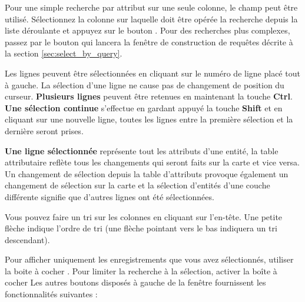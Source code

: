 Pour une simple recherche par attribut sur une seule colonne, le champ  peut être utilisé. Sélectionnez la colonne sur laquelle doit être opérée la recherche depuis la liste déroulante et appuyez sur le bouton . Pour des recherches plus complexes, passez par le bouton  qui lancera la fenêtre de construction de requêtes décrite à la section \ref{sec:select_by_query}.

Les lignes peuvent être sélectionnées en cliquant sur le numéro de ligne placé tout à gauche. La sélection d'une ligne ne cause pas de changement de position du curseur. \textbf{Plusieurs lignes} peuvent être retenues en maintenant la touche \textbf{Ctrl}. \textbf{Une sélection continue} s'effectue en gardant appuyé la touche \textbf{Shift} et en cliquant sur une nouvelle ligne, toutes les lignes entre la première sélection et la dernière seront prises.

\textbf{Une ligne sélectionnée} représente tout les attributs d'une entité, la table attributaire reflète tous les changements qui seront faits sur la carte et vice versa. Un changement de sélection depuis la table d'attributs provoque également un changement de sélection sur la carte et la sélection d'entités d'une couche différente signifie que d'autres lignes ont été sélectionnées.

Vous pouvez faire un tri sur les colonnes en cliquant sur l'en-tête. Une petite flèche indique l'ordre de tri (une flèche pointant vers le bas indiquera un tri descendant).

Pour afficher uniquement les enregistrements que vous avez sélectionnés, utiliser la boite à cocher . Pour limiter la recherche à la sélection, activer la boîte à cocher  Les autres boutons disposés à gauche de la fenêtre fournissent les fonctionnalités suivantes :

